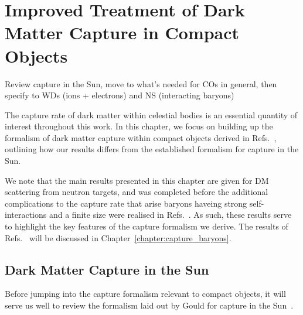 \graphicspath{{img/capture_intro/}}

\chapter{Improved Treatment of Dark Matter Capture in Compact Objects}
\label{chapter:capture_1}

\begin{synopsis}
Review capture in the Sun, move to what's needed for COs in general, then specify to WDs (ions + electrons) and NS (interacting baryons)
\end{synopsis}

The capture rate of dark matter within celestial bodies is an essential quantity of interest throughout this work.
In this chapter, we focus on building up the formalism of dark matter 
capture within compact objects derived in Refs.~\cite{Bell:2020jou_sep_ImprovedTreatmentDark,Bell:2020lmm_mar_ImprovedTreatmentDark}, outlining how our results differs from the 
established formalism for capture in the Sun. 


We note that the main results presented in this chapter are given for DM scattering from neutron targets, and was completed before the additional complications to the capture rate that arise baryons haveing strong self-interactions and a finite size were realised in Refs.~\cite{Bell:2020obw_sep_NucleonStructureStrong, Anzuini:2021lnv_nov_Improvedtreatmentdark}. As such, these results serve to highlight the key features of the capture formalism we derive. The results of Refs.~\cite{Bell:2020obw_sep_NucleonStructureStrong, Anzuini:2021lnv_nov_Improvedtreatmentdark} will be discussed in Chapter~\ref{chapter:capture_baryons}.




\section{Dark Matter Capture in the Sun}
\label{ch3:sec:solar_capture_full}

Before jumping into the capture formalism relevant to compact objects, it will serve us well to review the formalism laid out by Gould for capture in the Sun~\cite{Gould:1987ju_WeaklyInteractingMassive, Gould:1987ir_ResonantEnhancementsWIMP}. 

